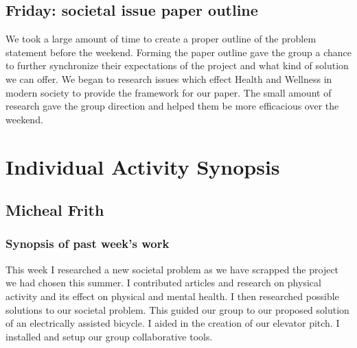 \documentclass[12pt,article,compsoc]{IEEEtran}
\begin{document}
	\subsection{Friday: societal issue paper outline}
		We took a large amount of time to create a proper outline of the problem statement before the weekend. 
		Forming the paper outline gave the group a chance to further synchronize their expectations of the project 
		and what kind of solution we can offer. We began to research issues which effect Health and Wellness in 
		modern society to provide the framework for our paper. The small amount of research gave the group direction 
		and helped them be more efficacious over the weekend. 
		\clearpage


\section{Individual Activity Synopsis}
	\subsection{Micheal Frith}

	\subsubsection*{Synopsis of past week's work}

	This week I researched a new societal problem as we have scrapped the project we had chosen this summer. I contributed articles and research on physical activity and its effect on physical and mental health. I then researched possible solutions to our societal problem. This guided our group to our proposed solution of an electrically assisted bicycle.	I aided in the creation of our elevator pitch. I installed and setup our group collaborative tools. 
\end{document}
